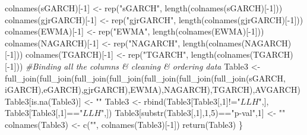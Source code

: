 \documentclass[a4paper, twoside]{templates/ociamthesis}
\newenvironment{Shaded}{\begin{snugshade}}{\end{snugshade}}
\newcommand{\CommentTok}[1]{\textcolor[rgb]{0.56,0.35,0.01}{\textit{#1}}}
\newcommand{\DecValTok}[1]{\textcolor[rgb]{0.00,0.00,0.81}{#1}}
\newcommand{\FunctionTok}[1]{\textcolor[rgb]{0.00,0.00,0.00}{#1}}
\newcommand{\NormalTok}[1]{#1}
\newcommand{\OtherTok}[1]{\textcolor[rgb]{0.56,0.35,0.01}{#1}}
\newcommand{\SpecialCharTok}[1]{\textcolor[rgb]{0.00,0.00,0.00}{#1}}
\newcommand{\StringTok}[1]{\textcolor[rgb]{0.31,0.60,0.02}{#1}}
\renewenvironment{Shaded}
{
  \vspace{10pt}%
  \begin{snugshade}%
}{%
  \end{snugshade}%
  \vspace{8pt}%
}
\begin{document}
\begin{Shaded}
\begin{Highlighting}[]
\FunctionTok{colnames}\NormalTok{(sGARCH)[}\SpecialCharTok{{-}}\DecValTok{1}\NormalTok{] }\OtherTok{\textless{}{-}} \FunctionTok{rep}\NormalTok{(}\StringTok{"sGARCH"}\NormalTok{, }\FunctionTok{length}\NormalTok{(}\FunctionTok{colnames}\NormalTok{(sGARCH)[}\SpecialCharTok{{-}}\DecValTok{1}\NormalTok{]))}
\FunctionTok{colnames}\NormalTok{(gjrGARCH)[}\SpecialCharTok{{-}}\DecValTok{1}\NormalTok{] }\OtherTok{\textless{}{-}} \FunctionTok{rep}\NormalTok{(}\StringTok{"gjrGARCH"}\NormalTok{, }\FunctionTok{length}\NormalTok{(}\FunctionTok{colnames}\NormalTok{(gjrGARCH)[}\SpecialCharTok{{-}}\DecValTok{1}\NormalTok{]))}
\FunctionTok{colnames}\NormalTok{(EWMA)[}\SpecialCharTok{{-}}\DecValTok{1}\NormalTok{] }\OtherTok{\textless{}{-}} \FunctionTok{rep}\NormalTok{(}\StringTok{"EWMA"}\NormalTok{, }\FunctionTok{length}\NormalTok{(}\FunctionTok{colnames}\NormalTok{(EWMA)[}\SpecialCharTok{{-}}\DecValTok{1}\NormalTok{]))}
\FunctionTok{colnames}\NormalTok{(NAGARCH)[}\SpecialCharTok{{-}}\DecValTok{1}\NormalTok{] }\OtherTok{\textless{}{-}} \FunctionTok{rep}\NormalTok{(}\StringTok{"NAGARCH"}\NormalTok{, }\FunctionTok{length}\NormalTok{(}\FunctionTok{colnames}\NormalTok{(NAGARCH)[}\SpecialCharTok{{-}}\DecValTok{1}\NormalTok{]))}
\FunctionTok{colnames}\NormalTok{(TGARCH)[}\SpecialCharTok{{-}}\DecValTok{1}\NormalTok{] }\OtherTok{\textless{}{-}} \FunctionTok{rep}\NormalTok{(}\StringTok{"TGARCH"}\NormalTok{, }\FunctionTok{length}\NormalTok{(}\FunctionTok{colnames}\NormalTok{(TGARCH)[}\SpecialCharTok{{-}}\DecValTok{1}\NormalTok{]))}
\CommentTok{\#Binding all the columns \& cleaning \& ordering data }
\NormalTok{Table3 }\OtherTok{\textless{}{-}} \FunctionTok{full\_join}\NormalTok{(}\FunctionTok{full\_join}\NormalTok{(}\FunctionTok{full\_join}\NormalTok{(}\FunctionTok{full\_join}\NormalTok{(}\FunctionTok{full\_join}\NormalTok{(}\FunctionTok{full\_join}\NormalTok{(}\FunctionTok{full\_join}\NormalTok{(sGARCH, iGARCH),eGARCH),gjrGARCH),EWMA),NAGARCH),TGARCH),AVGARCH)}
\NormalTok{Table3[}\FunctionTok{is.na}\NormalTok{(Table3)] }\OtherTok{\textless{}{-}} \StringTok{""}
\NormalTok{Table3 }\OtherTok{\textless{}{-}} \FunctionTok{rbind}\NormalTok{(Table3[Table3[,}\DecValTok{1}\NormalTok{]}\SpecialCharTok{!=}\StringTok{"$LLH$"}\NormalTok{,], Table3[Table3[,}\DecValTok{1}\NormalTok{]}\SpecialCharTok{==}\StringTok{"$LLH$"}\NormalTok{,])}
\NormalTok{Table3[}\FunctionTok{substr}\NormalTok{(Table3[,}\DecValTok{1}\NormalTok{],}\DecValTok{1}\NormalTok{,}\DecValTok{5}\NormalTok{)}\SpecialCharTok{==}\StringTok{"p{-}val"}\NormalTok{,}\DecValTok{1}\NormalTok{] }\OtherTok{\textless{}{-}} \StringTok{""}
\FunctionTok{colnames}\NormalTok{(Table3) }\OtherTok{\textless{}{-}} \FunctionTok{c}\NormalTok{(}\StringTok{""}\NormalTok{, }\FunctionTok{colnames}\NormalTok{(Table3)[}\SpecialCharTok{{-}}\DecValTok{1}\NormalTok{])}
\FunctionTok{return}\NormalTok{(Table3)}
\NormalTok{\}}


\end{Highlighting}
\end{Shaded}
\end{document}
